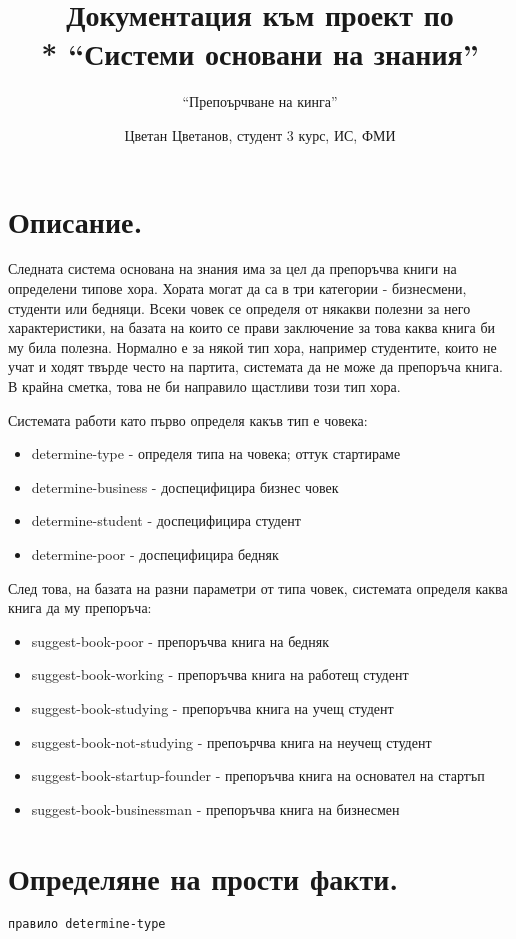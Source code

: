 \documentclass[a4paper]{article}
\title{Документация към проект по \\* ``Системи основани на знания''}
\subtitle{``Препоърчване на кинга''}
\author{Цветан Цветанов, студент 3 курс, ИС, ФМИ}
\begin{document}
\maketitle
\thispagestyle{empty}
\newpage

\section{Описание.}

Следната система основана на знания има за цел да препоръчва книги на 
определени типове хора.  Хората могат да са в три категории - бизнесмени,
студенти или бедняци.  Всеки човек се определя от някакви полезни за него
характеристики, на базата на които се прави заключение за това каква книга 
би му била полезна.  Нормално е за някой тип хора, например студентите, 
които не учат и ходят твърде често на партита, системата да не може да
препоръча книга.  В крайна сметка, това не би направило щастливи този тип
хора.

Системата работи като първо определя какъв тип е човека:
\begin{itemize}
\item determine-type - определя типа на човека; оттук стартираме
\item determine-business - доспецифицира бизнес човек
\item determine-student - доспецифицира студент
\item determine-poor - доспецифицира бедняк
\end{itemize}

След това, на базата на разни параметри от типа човек, системата определя
каква книга да му препоръча:
\begin{itemize}
\item suggest-book-poor - препоръчва книга на бедняк
\item suggest-book-working - препоръчва книга на работещ студент
\item suggest-book-studying - препоръчва книга на учещ студент
\item suggest-book-not-studying - препоърчва книга на неучещ студент
\item suggest-book-startup-founder - препоръчва книга на основател на стартъп
\item suggest-book-businessman - препоръчва книга на бизнесмен
\end{itemize}

\section{Определяне на прости факти.}
\begin{verbatim}правило determine-type\end{verbatim}
\end{document}
